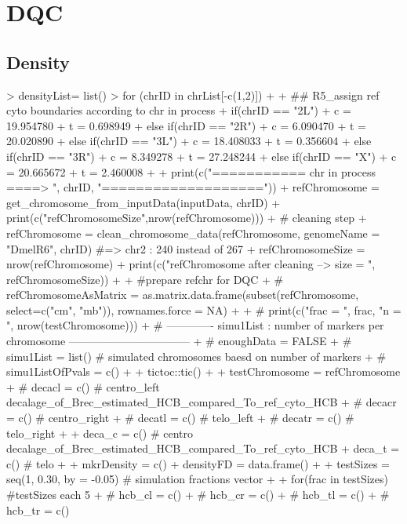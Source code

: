 \documentclass{article}
\begin{document}
\section{DQC}
\subsection{Density}

\begin{Schunk}
\begin{Sinput}
> densityList= list()
> for (chrID in chrList[-c(1,2)]) {
+ 
+     ## R5_assign ref cyto boundaries according to chr in process
+     if(chrID == "2L"){
+         c = 19.954780
+         t = 0.698949
+     }else if(chrID == "2R"){
+         c = 6.090470
+         t = 20.020890
+     }else if(chrID == "3L"){
+         c = 18.408033
+         t = 0.356604
+     }else if(chrID == "3R"){
+         c = 8.349278
+         t = 27.248244
+     }else if(chrID == "X"){
+         c =  20.665672
+         t =  2.460008
+     }
+     print(c("=========== chr in process ====> ", chrID, "==================="))
+     refChromosome = get_chromosome_from_inputData(inputData, chrID)
+     print(c("refChromosomeSize",nrow(refChromosome)))
+     # cleaning step
+     refChromosome = clean_chromosome_data(refChromosome, genomeName = "DmelR6", chrID) #=> chr2 : 240 instead of 267
+     refChromosomeSize = nrow(refChromosome)
+     print(c("refChromosome after cleaning --> size = ", refChromosomeSize))
+ 
+     #prepare refchr for DQC
+     # refChromosomeAsMatrix = as.matrix.data.frame(subset(refChromosome, select=c("cm", "mb")), rownames.force = NA)
+ 
+     # print(c("frac = ", frac, "n = ", nrow(testChromosome)))
+     # ------------- simu1List : number of markers per chromosome ---------------------------------
+     # enoughData = FALSE
+     # simu1List = list()  # simulated chromosomes baesd on number of markers
+     # simu1ListOfPvals = c()
+ 
+   tictoc::tic()
+ 
+     testChromosome = refChromosome
+     # decacl = c() # centro_left decalage_of_Brec_estimated_HCB_compared_To_ref_cyto_HCB
+     # decacr = c() # centro_right
+     # decatl = c() # telo_left
+     # decatr = c() # telo_right
+ 
+     deca_c = c() # centro decalage_of_Brec_estimated_HCB_compared_To_ref_cyto_HCB
+     deca_t = c() # telo
+ 
+     mkrDensity = c()
+     densityFD = data.frame()
+ 
+     testSizes = seq(1, 0.30, by = -0.05) # simulation fractions vector
+ 
+     for(frac in testSizes) {#testSizes each 5%
+         # hcb_cl = c()
+         # hcb_cr = c()
+         # hcb_tl = c()
+         # hcb_tr = c()
}}
\end{Sinput}
\end{Schunk}
\end{document}
